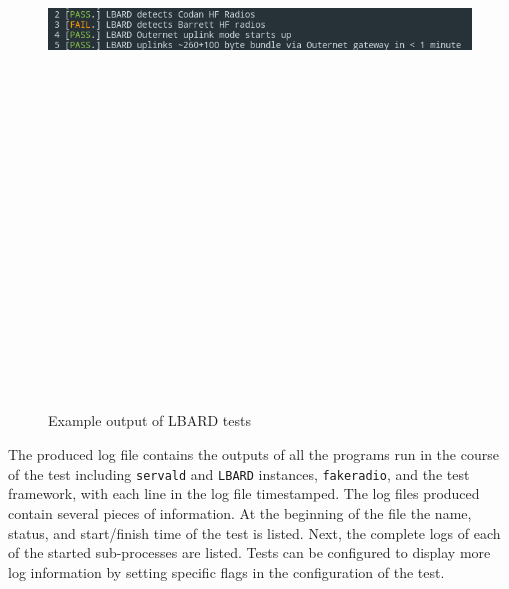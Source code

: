 \begin{figure}
    \begin{centering}
        \includegraphics[width=14cm,height=20cm,keepaspectratio]{Figures/testOutput1.png}
        \caption{Example output of LBARD tests}
        \label{fig:exampleTest}
    \end{centering}
\end{figure}

The produced log file contains the outputs of all the programs run in the course of the test including \texttt{servald} and \texttt{LBARD} instances, \texttt{fakeradio}, and the test framework, with each line in the log file timestamped.
The log files produced contain several pieces of information.
At the beginning of the file the name, status, and start/finish time of the test is listed.
Next, the complete logs of each of the started sub-processes are listed.
Tests can be configured to display more log information by setting specific flags in the configuration of the test.


